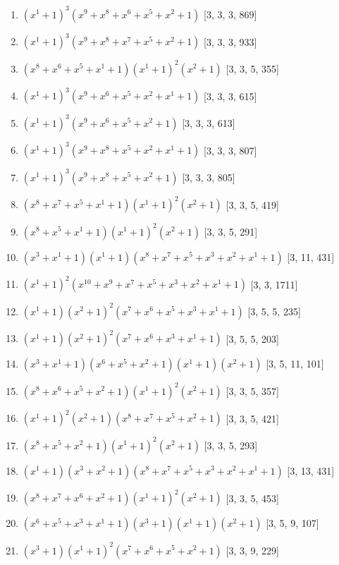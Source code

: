 \documentclass[10pt,twocolumn]{article}
\begin{document}
\begin{enumerate}
\item $(x^{1} + 1)^{3}(x^{9} + x^{8} + x^{6} + x^{5} + x^{2} + 1)$  [3, 3, 3, 869]
\item $(x^{1} + 1)^{3}(x^{9} + x^{8} + x^{7} + x^{5} + x^{2} + 1)$  [3, 3, 3, 933]
\item $(x^{8} + x^{6} + x^{5} + x^{1} + 1)(x^{1} + 1)^{2}(x^{2} + 1)$  [3, 3, 5, 355]
\item $(x^{1} + 1)^{3}(x^{9} + x^{6} + x^{5} + x^{2} + x^{1} + 1)$  [3, 3, 3, 615]
\item $(x^{1} + 1)^{3}(x^{9} + x^{6} + x^{5} + x^{2} + 1)$  [3, 3, 3, 613]
\item $(x^{1} + 1)^{3}(x^{9} + x^{8} + x^{5} + x^{2} + x^{1} + 1)$  [3, 3, 3, 807]
\item $(x^{1} + 1)^{3}(x^{9} + x^{8} + x^{5} + x^{2} + 1)$  [3, 3, 3, 805]
\item $(x^{8} + x^{7} + x^{5} + x^{1} + 1)(x^{1} + 1)^{2}(x^{2} + 1)$  [3, 3, 5, 419]
\item $(x^{8} + x^{5} + x^{1} + 1)(x^{1} + 1)^{2}(x^{2} + 1)$  [3, 3, 5, 291]
\item $(x^{3} + x^{1} + 1)(x^{1} + 1)(x^{8} + x^{7} + x^{5} + x^{3} + x^{2} + x^{1} + 1)$  [3, 11, 431]
\item $(x^{1} + 1)^{2}(x^{10} + x^{9} + x^{7} + x^{5} + x^{3} + x^{2} + x^{1} + 1)$  [3, 3, 1711]
\item $(x^{1} + 1)(x^{2} + 1)^{2}(x^{7} + x^{6} + x^{5} + x^{3} + x^{1} + 1)$  [3, 5, 5, 235]
\item $(x^{1} + 1)(x^{2} + 1)^{2}(x^{7} + x^{6} + x^{3} + x^{1} + 1)$  [3, 5, 5, 203]
\item $(x^{3} + x^{1} + 1)(x^{6} + x^{5} + x^{2} + 1)(x^{1} + 1)(x^{2} + 1)$  [3, 5, 11, 101]
\item $(x^{8} + x^{6} + x^{5} + x^{2} + 1)(x^{1} + 1)^{2}(x^{2} + 1)$  [3, 3, 5, 357]
\item $(x^{1} + 1)^{2}(x^{2} + 1)(x^{8} + x^{7} + x^{5} + x^{2} + 1)$  [3, 3, 5, 421]
\item $(x^{8} + x^{5} + x^{2} + 1)(x^{1} + 1)^{2}(x^{2} + 1)$  [3, 3, 5, 293]
\item $(x^{1} + 1)(x^{3} + x^{2} + 1)(x^{8} + x^{7} + x^{5} + x^{3} + x^{2} + x^{1} + 1)$  [3, 13, 431]
\item $(x^{8} + x^{7} + x^{6} + x^{2} + 1)(x^{1} + 1)^{2}(x^{2} + 1)$  [3, 3, 5, 453]
\item $(x^{6} + x^{5} + x^{3} + x^{1} + 1)(x^{3} + 1)(x^{1} + 1)(x^{2} + 1)$  [3, 5, 9, 107]
\item $(x^{3} + 1)(x^{1} + 1)^{2}(x^{7} + x^{6} + x^{5} + x^{2} + 1)$  [3, 3, 9, 229]

\end{enumerate}
\end{document}
